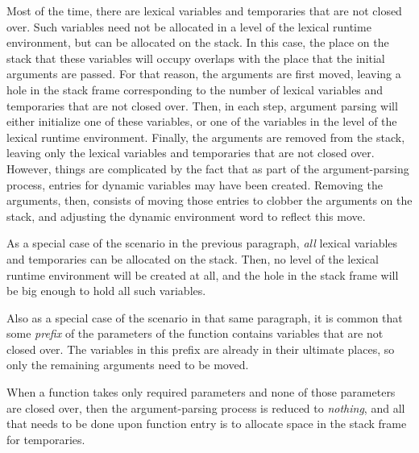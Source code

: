 Most of the time, there are lexical variables and temporaries that are
not closed over.  Such variables need not be allocated in a level of
the lexical runtime environment, but can be allocated on the stack.
In this case, the place on the stack that these variables will occupy
overlaps with the place that the initial arguments are passed.  For
that reason, the arguments are first moved, leaving a hole in the
stack frame corresponding to the number of lexical variables and
temporaries that are not closed over.  Then, in each step, argument
parsing will either initialize one of these variables, or one of the
variables in the level of the lexical runtime environment.  Finally,
the arguments are removed from the stack, leaving only the lexical
variables and temporaries that are not closed over.  However, things
are complicated by the fact that as part of the argument-parsing
process, entries for dynamic variables may have been created.
Removing the arguments, then, consists of moving those entries to
clobber the arguments on the stack, and adjusting the dynamic
environment word to reflect this move.

As a special case of the scenario in the previous paragraph,
\emph{all} lexical variables and temporaries can be allocated on the
stack.  Then, no level of the lexical runtime environment will be
created at all, and the hole in the stack frame will be big enough to
hold all such variables.

Also as a special case of the scenario in that same paragraph, it is
common that some \emph{prefix} of the parameters of the function
contains variables that are not closed over.  The variables in this
prefix are already in their ultimate places, so only the remaining
arguments need to be moved.

When a function takes only required parameters and none of those
parameters are closed over, then the argument-parsing process is
reduced to \emph{nothing}, and all that needs to be done upon function
entry is to allocate space in the stack frame for temporaries.

